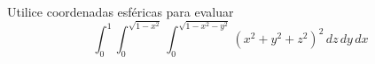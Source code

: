 \item Utilice coordenadas esféricas para evaluar
\[ \int_0^1 \int_0^{\sqrt{1-x^2}} \int_0^{\sqrt{1-x^2-y^2}} (x^2 + y^2 + z^2)^2 \, dz \, dy \, dx \]
